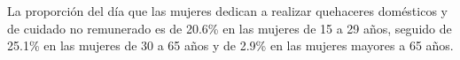 La proporción del día que las mujeres dedican a realizar quehaceres domésticos y de cuidado no remunerado es de 20.6\% en las mujeres de 15 a 29 años, seguido de 25.1\% en las mujeres de 30 a 65 años y  de 2.9\% en las mujeres mayores a 65 años. 